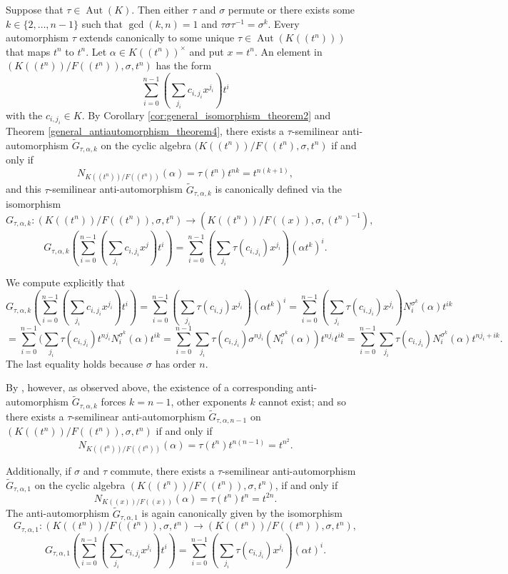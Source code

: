 \documentclass{amsart}
\theoremstyle{plain}
\theoremstyle{definition}
\numberwithin{equation}{section}
\numberwithin{figure}{section}
\DeclareMathOperator{\Aut}{Aut}
\begin{document}
Suppose that  $\tau\in \Aut(K)$. Then either $\tau$ and $\sigma$ permute or there exists some $k\in \{2,\dots, n-1 \}$ such that $\gcd (k, n)=1$  and $\tau \sigma\tau^{-1}=\sigma^k$. Every automorphism $\tau$ extends canonically to some unique $\tau\in \Aut(K((t^n)))$ that maps $t^n$ to $t^n$.
 Let $\alpha\in K((t^n))^\times$ and put $x=t^n$.  An element in $(K((t^n))/F((t^n)),\sigma,t^n)$ has the form
 $$
 \sum_{i=0}^{n-1}(\sum_{j_i}c_{i,{j_i}} x^{j_i}) t^i$$
 with the $c_{i,{j_i}}\in K$. By  Corollary \ref{cor:general_isomorphism_theorem2} and Theorem   \ref{general_antiautomorphism_theorem4},
 there exists a $\tau$-semilinear anti-automorphism $\widetilde G_{\tau,\alpha,k}$ on the cyclic algebra $ (K((t^n))/F((t^n),\sigma, t^n)$
  if and only if
 $$N_{K((t^n))/F((t^n))}(\alpha)=\tau(t^n)t^{nk}=t^{n(k+1)},$$
 and this $\tau$-semilinear anti-automorphism $\widetilde G_{\tau,\alpha,k}$ is canonically defined via the isomorphism
 $$G_{\tau,\alpha,k}: (K((t^n))/F((t^n)),\sigma,t^n)\to (K((t^n))/F((x)),\sigma, (t^n)^{-1}),$$
  $$ G_{\tau,\alpha,k} ( \sum_{i=0}^{n-1}(\sum_{j_i}c_{i,{j_i}} x^j) t^i ) =
\sum_{i=0}^{n-1}(\sum_{j_i}\tau(c_{i,{j_i}}) x^{j_i}) (\alpha t^k)^i.$$


 We compute explicitly that
  $$
 G_{\tau,\alpha,k} ( \sum_{i=0}^{n-1}(\sum_{j_i}c_{i,{j_i}} x^{j_i}) t^i ) =
\sum_{i=0}^{n-1}(\sum_{j_i}\tau(c_{i,j}) x^{j_i}) (\alpha t^k)^i =
\sum_{i=0}^{n-1}(\sum_{j_i}\tau(c_{i,{j_i}}) x^{j_i})  N_i^{\sigma^k}(\alpha) t^{ik}
$$
$$ = \sum_{i=0}^{n-1}(\sum_{j_i}\tau(c_{i,{j_i}}) t^{n{j_i}}  N_i^{\sigma^k}(\alpha) t^{ik}
=  \sum_{i=0}^{n-1}\sum_{j_i}\tau(c_{i,{j_i}}) \sigma^{n{j_i}}( N_i^{\sigma^k}(\alpha)) t^{n{j_i}}  t^{ik}
=  \sum_{i=0}^{n-1}\sum_{j_i}\tau(c_{i,{j_i}})  N_i^{\sigma^k}(\alpha) t^{n{j_i}+ik}.$$
The last equality holds because $\sigma$ has order $n$.

 By \cite[Proposition 4.3]{MST}, however, as observed above, the existence of a corresponding anti-automorphism $\widetilde G_{\tau,\alpha,k}$ forces $k=n-1$, other exponents $k$ cannot exist; and so
   there exists a $\tau$-semilinear anti-automorphism $\widetilde G_{\tau,\alpha,n-1}$ on $(K((t^n))/F((t^n)),\sigma,t^n)$
  if and only if
  $$N_{K((t^n))/F((t^n))}(\alpha)=\tau(t^n)t^{n(n-1)}=t^{n^2}.$$

  Additionally, if $\sigma$ and $\tau$ commute, there exists a $\tau$-semilinear anti-automorphism $\widetilde G_{\tau,\alpha,1}$ on the cyclic algebra $(K((t^n))/F((t^n)),\sigma,t^n)$,
  if and only if
 $$N_{K((x))/F((x))}(\alpha)=\tau(t^n)t^n=t^{2n}.$$
 The anti-automorphism $\widetilde G_{\tau,\alpha,1}$ is again canonically given by the isomorphism
 $$ G_{\tau,\alpha,1}: (K((t^n))/F((t^n)),\sigma,t^n)\to (K((t^n))/F((t^n)),\sigma, t^n),$$
  $$
 G_{\tau,\alpha,1}( \sum_{i=0}^{n-1}(\sum_{j_i}c_{i,{j_i}} x^{j_i}) t^i ) =
\sum_{i=0}^{n-1}(\sum_{j_i}\tau(c_{i,{j_i}}) x^{j_i}) (\alpha t)^i.
$$
\end{document}
